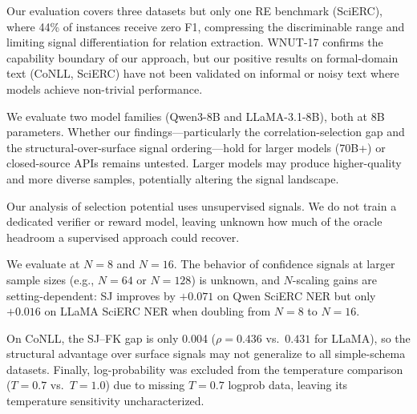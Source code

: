Our evaluation covers three datasets but only one RE benchmark (SciERC), where 44\% of instances receive zero F1, compressing the discriminable range and limiting signal differentiation for relation extraction.
WNUT-17 confirms the capability boundary of our approach, but our positive results on formal-domain text (CoNLL, SciERC) have not been validated on informal or noisy text where models achieve non-trivial performance.

We evaluate two model families (Qwen3-8B and LLaMA-3.1-8B), both at 8B parameters.
Whether our findings---particularly the correlation-selection gap and the structural-over-surface signal ordering---hold for larger models (70B+) or closed-source APIs remains untested.
Larger models may produce higher-quality and more diverse samples, potentially altering the signal landscape.

Our analysis of selection potential uses unsupervised signals.
We do not train a dedicated verifier or reward model, leaving unknown how much of the oracle headroom a supervised approach could recover.

We evaluate at $N{=}8$ and $N{=}16$.
The behavior of confidence signals at larger sample sizes (e.g., $N{=}64$ or $N{=}128$) is unknown, and $N$-scaling gains are setting-dependent: SJ improves by $+0.071$ on Qwen SciERC NER but only $+0.016$ on LLaMA SciERC NER when doubling from $N{=}8$ to $N{=}16$.

On CoNLL, the SJ--FK gap is only 0.004 ($\rho{=}0.436$ vs.\ $0.431$ for LLaMA), so the structural advantage over surface signals may not generalize to all simple-schema datasets.
Finally, log-probability was excluded from the temperature comparison ($T{=}0.7$ vs.\ $T{=}1.0$) due to missing $T{=}0.7$ logprob data, leaving its temperature sensitivity uncharacterized.
